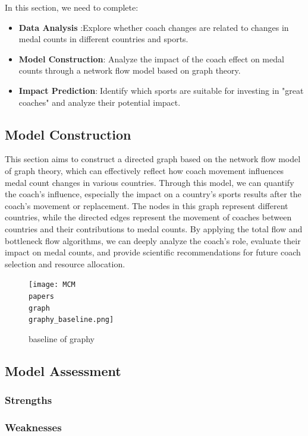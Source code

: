\documentclass{mcmthesis}
\begin{document}
    In this section, we need to complete:

\begin{itemize}   
    \item {\bf Data Analysis} :Explore whether coach changes are related to changes in medal counts in different countries and sports.
    \item {\bf Model Construction}: Analyze the impact of the coach effect on medal counts through a network flow model based on graph theory.
    \item {\bf Impact Prediction}:Identify which sports are suitable for investing in "great coaches" and analyze their potential impact.
\end{itemize} 

\subsection{Model Construction}

    This section aims to construct a directed graph based on the network flow model of graph theory, which can effectively reflect how coach movement influences medal count changes in various countries. Through this model, we can quantify the coach’s influence, especially the impact on a country’s sports results after the coach's movement or replacement. The nodes in this graph represent different countries, while the directed edges represent the movement of coaches between countries and their contributions to medal counts. By applying the total flow and bottleneck flow algorithms, we can deeply analyze the coach's role, evaluate their impact on medal counts, and provide scientific recommendations for future coach selection and resource allocation.

    \begin{figure}[h]   
        \centering          
        \texttt{[image: MCM\\papers\\graph\\graphy\_baseline.png]}
        \caption{baseline of graphy} \label{fig1}    
    \end{figure}


\subsection{Model Assessment}

\subsubsection{Strengths}
\subsubsection{Weaknesses}
\end{document}
